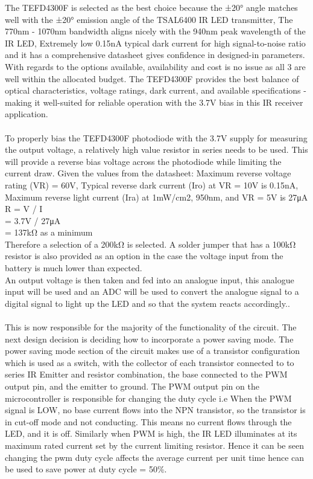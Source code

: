 \documentclass[class=report,11pt,crop=false]{standalone}
\begin{document}
  The TEFD4300F is selected as the best choice because the ±20° angle matches well with the ±20° emission angle of the TSAL6400 IR LED transmitter, The 770nm - 1070nm bandwidth aligns nicely with the 940nm peak wavelength of the IR LED, Extremely low 0.15nA typical dark current for high signal-to-noise ratio and it has a comprehensive datasheet gives confidence in designed-in parameters.\\
  With regards to the options available, availability and cost is no issue as all 3 are well within the allocated budget. The TEFD4300F provides the best balance of optical characteristics, voltage ratings, dark current, and available specifications - making it well-suited for reliable operation with the 3.7V bias in this IR receiver application. \\\\
  To properly bias the TEFD4300F photodiode with the 3.7V supply for measuring the output voltage, a relatively high value resistor in series needs to be used. This will provide a reverse bias voltage across the photodiode while limiting the current draw. Given the values from the datasheet: Maximum reverse voltage rating (VR) = 60V,
Typical reverse dark current (Iro) at VR = 10V is 0.15nA,
Maximum reverse light current (Ira) at 1mW/cm2, 950nm, and VR = 5V is 27μA\\
R = V / I \\
= 3.7V / 27μA\\
= 137kΩ as a minimum\\
Therefore a selection of a 200kΩ is selected. A solder jumper that has a 100kΩ resistor is also provided as an option in the case the voltage input from the battery is much lower than expected.
\\
An output voltage is then taken and fed into an analogue input, this analogue input will be used and an ADC will be used to convert the analogue signal to a digital signal to light up the LED and so that the system reacts accordingly..
\\\\
This is now responsible for the majority of the functionality of the circuit. The next design decision is deciding how to incorporate a power saving mode. The power saving mode section of the circuit makes use of a transistor configuration which is used as a switch, with the collector of each transistor connected to to series IR Emitter and resistor combination, the base connected to the PWM output pin, and the emitter to ground. The PWM output pin on the microcontroller is responsible for changing the duty cycle i.e When the PWM signal is LOW, no base current flows into the NPN transistor, so the transistor is in cut-off mode and not conducting. This means no current flows through the LED, and it is off. Similarly when PWM is high, the IR LED illuminates at its maximum rated current set by the current limiting resistor. Hence it  can be seen changing the pwm duty cycle affects the average current per unit time hence can be used to save power at duty cycle = 50\%.\\\\
\end{document}

